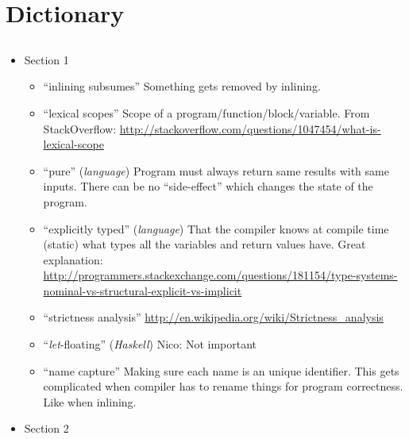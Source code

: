 
\section{Dictionary}


\subsection{\cite{GHC-paper}}
\begin{itemize}

	\item Section 1
\begin{itemize}

	\item ``inlining subsumes''
Something gets removed by inlining.

	\item ``lexical scopes''
Scope of a program/function/block/variable.
From StackOverflow:
\url{http://stackoverflow.com/questions/1047454/what-is-lexical-scope}

	\item ``pure'' (\textit{language})
Program must always return same results with same inputs. There can be no
``side-effect'' which changes the state of the program.

	\item ``explicitly typed'' (\textit{language})
That the compiler knows at compile time (static) what types all the variables
and return values have.
Great explanation: \url{http://programmers.stackexchange.com/questions/181154/type-systems-nominal-vs-structural-explicit-vs-implicit}

	\item ``strictness analysis''
\url{http://en.wikipedia.org/wiki/Strictness_analysis}

	\item ``\textit{let}-floating'' (\textit{Haskell})
Nico: Not important

	\item ``name capture''
Making sure each name is an unique identifier. This gets complicated when
compiler has to rename things for program correctness. Like when inlining.

\end{itemize}

	\item Section 2
\begin{itemize}


\end{itemize}
\end{itemize}
